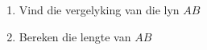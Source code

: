 \begin{eocexercises}{}
\begin{enumerate}[noitemsep, label=\textbf{\arabic*}. ]
\begin{figure}[H]
\end{figure} 
    \begin{enumerate}[noitemsep, label=\textbf{\alph*}. ] 
    \item Vind die vergelyking van die lyn $AB$ 
    \item Bereken die lengte van $AB$
    \end{enumerate}
\end{enumerate}

\end{eocexercises}